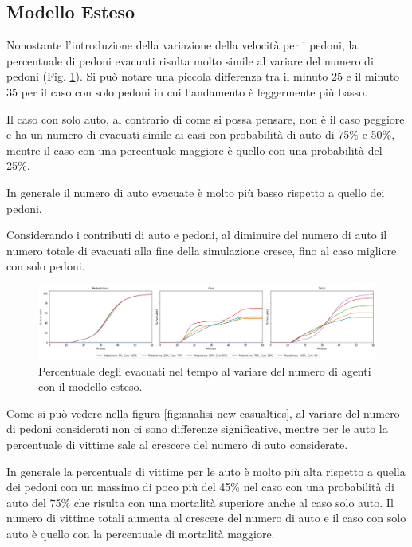 \pagebreak

\subsection{Modello Esteso}
Nonostante l'introduzione della variazione della velocità per i pedoni,
la percentuale di pedoni evacuati risulta molto simile al variare del numero di pedoni (Fig. \ref{fig:analisi-new-evacuated}).
Si può notare una piccola differenza tra il minuto 25 e il minuto 35 per il caso con solo pedoni in cui l'andamento è leggermente più basso.

Il caso con solo auto, al contrario di come si possa pensare, non è il caso peggiore e ha un numero di evacuati simile ai casi
con probabilità di auto di 75\% e 50\%, mentre il caso con una percentuale maggiore è quello con una probabilità del 25\%.

In generale il numero di auto evacuate è molto più basso rispetto a quello dei pedoni.

Considerando i contributi di auto e pedoni, al diminuire del numero di auto il numero totale di evacuati alla fine della simulazione cresce,
fino al caso migliore con solo pedoni.

\begin{figure}[ht]
    \centering
    \includegraphics[width=\textwidth]{images/analisi/new-evacuated.png}
    \caption{Percentuale degli evacuati nel tempo al variare del numero di agenti con il modello esteso.}
    \label{fig:analisi-new-evacuated}
\end{figure}

Come si può vedere nella figura \ref{fig:analisi-new-casualties}, al variare del numero di pedoni considerati non ci sono differenze significative,
mentre per le auto la percentuale di vittime sale al crescere del numero di auto considerate.

In generale la percentuale di vittime per le auto è molto più alta rispetto a quella dei pedoni
con un massimo di poco più del 45\% nel caso con una probabilità di auto del 75\% che risulta con una mortalità superiore anche al caso solo auto.
%
Il numero di vittime totali aumenta al crescere del numero di auto e il caso con solo auto è quello con la percentuale di mortalità maggiore.


